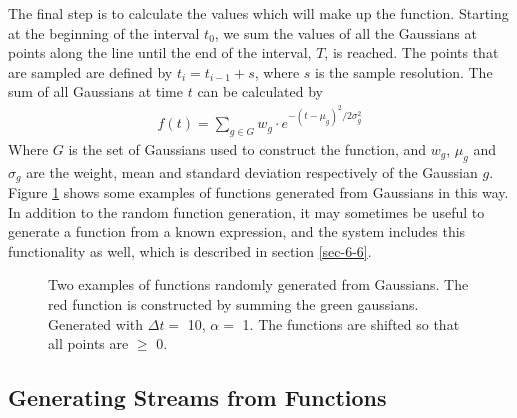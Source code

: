 \documentclass[a4paper,11pt,twoside]{article}
\begin{document}
   The final step is to calculate the values which will make up the
   function. Starting at the beginning of the interval $t_0$, we sum the values
   of all the Gaussians at points along the line until the end of the interval,
   $T$, is reached. The points that are sampled are defined by $t_i=t_{i-1}+s$,
   where $s$ is the sample resolution. The sum of all Gaussians at time $t$ can
   be calculated by
   \begin{align}
   f(t) = \sum_{g\in G}w_g\cdot e^{-(t-\mu_g)^2/2\sigma_g^2}
   \end{align}
   Where $G$ is the set of Gaussians used to construct the function, and $w_g$,
   $\mu_g$ and $\sigma_g$ are the weight, mean and standard deviation
   respectively of the Gaussian $g$. Figure \ref{fig:contrib} shows
   some examples of functions generated from Gaussians in this way. In addition
   to the random function generation, it may sometimes be useful to generate a
   function from a known expression, and the system includes this functionality
   as well, which is described in section \ref{sec-6-6}.
   \begin{figure}
   \caption{Two examples of functions randomly generated from Gaussians. The red
   function is constructed by summing the green gaussians. Generated with
   $\Delta t=$ 10, $\alpha=$ 1. The functions are shifted so that all points
   are $\geq$ 0.}
   \label{fig:contrib}
   \end{figure}
\subsection{Generating Streams from Functions}
\label{sec-3-2}
\end{document}
